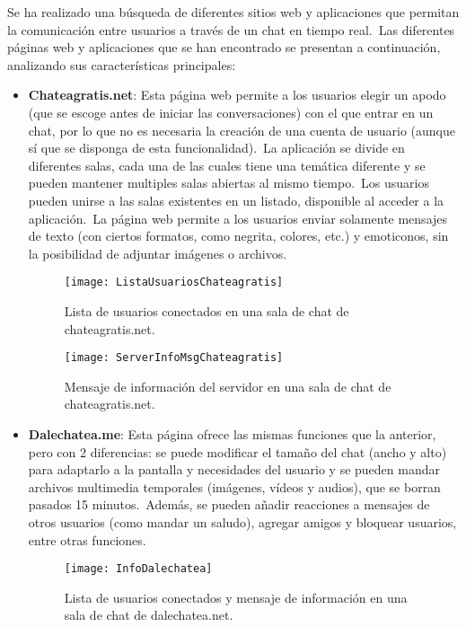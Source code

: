 
Se ha realizado una búsqueda de diferentes sitios web y aplicaciones que permitan la comunicación entre usuarios a
través de un chat en tiempo real.\ Las diferentes páginas web y aplicaciones que se han encontrado se presentan a
continuación, analizando sus características principales:

\begin{itemize}
	\item \textbf{Chateagratis.net}: Esta página web permite a los usuarios elegir un apodo (que se escoge antes de iniciar las
	conversaciones) con el que entrar en un chat, por lo que no es necesaria la creación de una cuenta de usuario
	(aunque sí que se disponga de esta funcionalidad).\ La aplicación se divide en diferentes salas, cada una de las cuales
	tiene una temática diferente y se pueden mantener multiples salas abiertas al mismo tiempo.\ Los usuarios pueden
	unirse a las salas existentes en un listado, disponible al acceder a la aplicación.\ La página web
	permite a los usuarios enviar solamente mensajes de texto (con ciertos formatos, como negrita, colores, etc.) y
	emoticonos, sin la posibilidad de adjuntar imágenes o archivos.

	\begin{figure}[H]
		\centering
		\texttt{[image: ListaUsuariosChateagratis]}
		\caption{Lista de usuarios conectados en una sala de chat de chateagratis.net.}
		\label{fig:ListaUsuariosChateagratis}
	\end{figure}

	\begin{figure}[H]
		\centering
		\texttt{[image: ServerInfoMsgChateagratis]}
		\caption{Mensaje de información del servidor en una sala de chat de chateagratis.net.}
		\label{fig:ServerInfoMsgChateagratis}
	\end{figure}

	\item \textbf{Dalechatea.me}: Esta página ofrece las mismas funciones que la anterior, pero con 2 diferencias: se
	puede modificar el tamaño del chat (ancho y alto) para adaptarlo a la pantalla y necesidades del usuario y se
	pueden mandar archivos multimedia temporales (imágenes, vídeos y audios), que se borran pasados 15 minutos.\ Además,
	se pueden añadir reacciones a mensajes de otros usuarios (como mandar un saludo), agregar amigos y bloquear
	usuarios, entre otras funciones.

	\begin{figure}[H]
		\centering
		\hspace{1.5cm}
		\texttt{[image: InfoDalechatea]}
		\caption{Lista de usuarios conectados y mensaje de información en una sala de chat de dalechatea.net.}
		\label{fig:UsuariosEInfoDalechatea}
	\end{figure}

\end{itemize}
\label{itm:estadoDelArte}

